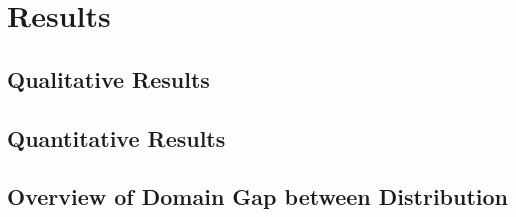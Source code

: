 \section{Results}

\subsection{Qualitative Results}

\subsection{Quantitative Results}

\subsection{Overview of Domain Gap between Distribution}

